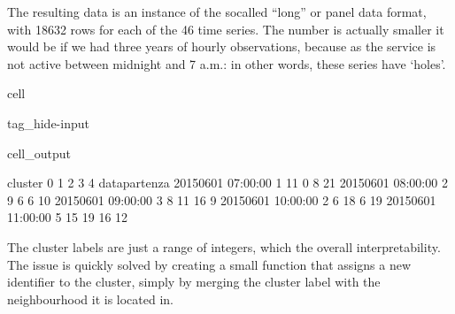 \documentclass[letterpaper,10pt,english]{jupyterBook}
\begin{document}
\sphinxAtStartPar
The resulting data is an instance of the so\sphinxhyphen{}called “long” or panel data format, with 18632 rows for each of the 46 time series. The number is actually smaller it would be if we had three years of hourly observations, because as the service is not active between midnight and 7 a.m.: in other words, these series have ‘holes’.

\begin{sphinxuseclass}{cell}
\begin{sphinxuseclass}{tag_hide-input}
\begin{sphinxuseclass}{cell_output}
\begin{sphinxVerbatim}[commandchars=\\\{\}]
cluster              0   1   2   3   4
data\PYGZus{}partenza                         
2015\PYGZhy{}06\PYGZhy{}01 07:00:00  1  11   0   8  21
2015\PYGZhy{}06\PYGZhy{}01 08:00:00  2   9   6   6  10
2015\PYGZhy{}06\PYGZhy{}01 09:00:00  3   8  11  16   9
2015\PYGZhy{}06\PYGZhy{}01 10:00:00  2   6  18   6  19
2015\PYGZhy{}06\PYGZhy{}01 11:00:00  5  15  19  16  12
\end{sphinxVerbatim}

\end{sphinxuseclass}
\end{sphinxuseclass}
\end{sphinxuseclass}
\sphinxAtStartPar
The cluster labels are just a range of integers, which the overall interpretability. The issue is quickly solved by creating a small function that assigns a new identifier to the cluster, simply by merging the cluster label with the neighbourhood it is located in.
\end{document}
